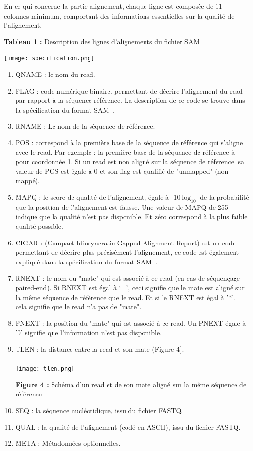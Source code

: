 \documentclass[a4paper,12pt]{article}
\begin{document}
En ce qui concerne la partie alignement, chaque ligne est composée de 11 colonnes minimum, comportant des informations essentielles sur la qualité de l'alignement.   \\
  \begin{center}
  \textbf{ Tableau 1 : }Description des lignes d'alignements du fichier SAM 
    \end{center}
      \begin{center}
  \texttt{[image: specification.png]}~
    \end{center}
\begin{enumerate}
\item QNAME :	le nom du read.
\item FLAG  :	code numérique binaire, permettant de décrire l'alignement du read par rapport à la séquence référence. La description de ce code se trouve dans la spécification du format SAM~\cite{SAM}.
\item RNAME :	Le nom de la séquence de référence.
\item POS	: correspond à la première base de la séquence de référence qui s'aligne avec le read. Par exemple : la première base de la séquence de référence à pour coordonnée 1. Si un read est non aligné sur la séquence de réference, sa valeur de POS est égale à 0 et son flag est qualifié de "unmapped" (non mappé). 
\item MAPQ  :	le score de qualité de l'alignement, égale à -10$\log_{10}$ de la probabilité que la position de l'alignement est fausse. Une valeur de MAPQ de 255 indique que la qualité n'est pas disponible. Et zéro correspond à la plus faible qualité possible. 
\item CIGAR :   (Compact Idiosyncratic Gapped Alignment Report) est un code permettant de décrire plus précisément l'alignement, ce code est également expliqué dans la spécification du format SAM~\cite{SAM}.
\item RNEXT	: le nom du "mate" qui est associé à ce read (en cas de séquençage paired-end). Si RNEXT est égal à ‘=’, ceci signifie que le mate est aligné sur la même séquence de référence que le read. Et si le RNEXT est égal à '*', cela signifie que le read n'a pas de "mate". 
\item PNEXT	: la position du "mate" qui est associé à ce read. Un PNEXT égale à '0' signifie que l'information n'est pas disponible. 
\item TLEN : la distance entre la read et son mate (Figure 4). \\\\
\texttt{[image: tlen.png]}~
  \begin{center}\textbf{ Figure 4 : }Schéma d'un read et de son mate aligné sur la même séquence de référence     \end{center} 
\item SEQ	: la séquence nucléotidique, issu du fichier FASTQ.
\item QUAL : la qualité de l'alignement (codé en ASCII), issu du fichier FASTQ.
\item META : Métadonnées optionnelles. 
\end{enumerate}
\end{document}
